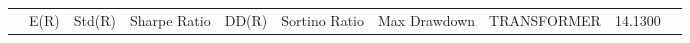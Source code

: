 \begin{tabular}{lrrrrrrrrr}
 & E(R) & Std(R) & Sharpe Ratio & DD(R) & Sortino Ratio & Max Drawdown & %
TRANSFORMER & 14.1300%
\end{tabular}
